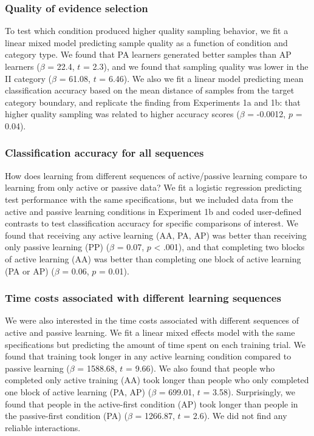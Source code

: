 \documentclass[10pt, letterpaper]{article}
\begin{document}
\subsubsection{Quality of evidence
selection}\label{quality-of-evidence-selection}

To test which condition produced higher quality sampling behavior, we
fit a linear mixed model predicting sample quality as a function of
condition and category type. We found that PA learners generated better
samples than AP learners (\(\beta\) = 22.4, \(t\) = 2.3), and we found
that sampling quality was lower in the II category (\(\beta\) = 61.08,
\(t\) = 6.46). We also we fit a linear model predicting mean
classification accuracy based on the mean distance of samples from the
target category boundary, and replicate the finding from Experiments 1a
and 1b: that higher quality sampling was related to higher accuracy
scores (\(\beta\) = -0.0012, \(p\) = 0.04).

\subsubsection{Classification accuracy for all
sequences}\label{classification-accuracy-for-all-sequences}

How does learning from different sequences of active/passive learning
compare to learning from only active or passive data? We fit a logistic
regression predicting test performance with the same specifications, but
we included data from the active and passive learning conditions in
Experiment 1b and coded user-defined contrasts to test classification
accuracy for specific comparisons of interest. We found that receiving
any active learning (AA, PA, AP) was better than receiving only passive
learning (PP) (\(\beta\) = 0.07, \(p\) \textless{} .001), and that
completing two blocks of active learning (AA) was better than completing
one block of active learning (PA or AP) (\(\beta\) = 0.06, \(p\) =
0.01).

\subsubsection{Time costs associated with different learning
sequences}\label{time-costs-associated-with-different-learning-sequences}

We were also interested in the time costs associated with different
sequences of active and passive learning. We fit a linear mixed effects
model with the same specifications but predicting the amount of time
spent on each training trial. We found that training took longer in any
active learning condition compared to passive learning (\(\beta\) =
1588.68, \(t\) = 9.66). We also found that people who completed only
active training (AA) took longer than people who only completed one
block of active learning (PA, AP) (\(\beta\) = 699.01, \(t\) = 3.58).
Surprisingly, we found that people in the active-first condition (AP)
took longer than people in the passive-first condition (PA) (\(\beta\) =
1266.87, \(t\) = 2.6). We did not find any reliable interactions.
\end{document}
